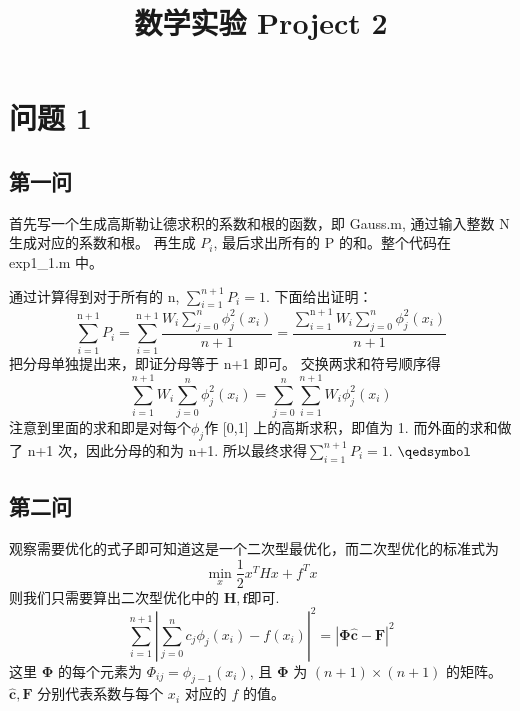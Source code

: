 \documentclass[11pt]{ctexart}
\title{数学实验 Project 2}
\begin{document}
    \maketitle
    \section{问题 1}

    \subsection{第一问}
    首先写一个生成高斯勒让德求积的系数和根的函数，即 Gauss.m, 通过输入整数 N 生成对应的系数和根。
    再生成 $P_i$, 最后求出所有的 P 的和。整个代码在 exp1\_1.m 中。

    通过计算得到对于所有的 n, \(\sum_{i=1}^{n+1}P_i=1\).
    下面给出证明：
    \begin{equation}
        \sum_{i=1}^{\mathrm{n}+1} P_{i}=\sum_{i=1}^{\mathrm{n}+1} \frac{W_{i} \sum_{j=0}^{n} \phi_{j}^{2}\left(x_{i}\right)}{n+1}
        = \frac{\sum_{i=1}^{\mathrm{n}+1}W_{i} \sum_{j=0}^{n} \phi_{j}^{2}\left(x_{i}\right)}{n+1}
    \end{equation}
    把分母单独提出来，即证分母等于 n+1 即可。
    交换两求和符号顺序得
    \begin{equation}
        \sum_{i=1}^{n+1}W_{i} \sum_{j=0}^{n} \phi_{j}^{2}\left(x_{i}\right)=\sum_{j=0}^{n}\sum_{i=1}^{n+1}W_i\phi_{j}^2(x_i)
    \end{equation}
    注意到里面的求和即是对每个$\phi_j$作 [0,1] 上的高斯求积，即值为 1.
    而外面的求和做了 n+1 次，因此分母的和为 n+1.
    所以最终求得\(\sum_{i=1}^{n+1}P_i=1\). \hfill \(\qedsymbol\)

    \subsection{第二问}
    观察需要优化的式子即可知道这是一个二次型最优化，而二次型优化的标准式为
    \begin{equation}
        \min _{x} \frac{1}{2} x^{T} H x+f^{T} x
    \end{equation}
    则我们只需要算出二次型优化中的 $\mathbf{H,f}$即可.
    \begin{equation}
        \sum_{i=1}^{n+1}\left|\sum_{j=0}^{n} c_{j} \phi_{j}\left(x_{i}\right)-f\left(x_{i}\right)\right|^{2}=
        |\mathbf{\Phi} \mathbf {\hat{c}}-\mathbf F|^2
    \end{equation}
    这里 $\mathbf{\Phi}$ 的每个元素为 $\Phi_{ij}=\phi _{j-1}(x_i)$, 且 \(\mathbf{\Phi}\) 为 \((n+1)\times(n+1)\) 的矩阵。
    \(\mathbf{\hat{c},F}\) 分别代表系数与每个 \(x_i\) 对应的 \(f\) 的值。
\end{document}
